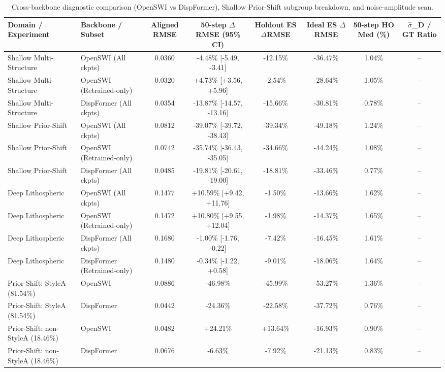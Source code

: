 \begin{table}[t]
\centering
\scriptsize
\caption{Cross-backbone diagnostic comparison (OpenSWI vs DispFormer), Shallow Prior-Shift subgroup breakdown, and noise-amplitude scan.}
\label{tab:cross_backbone_diagnostics}
\begin{tabular}{llcccccc}
\toprule
Domain / Experiment & Backbone / Subset & Aligned RMSE & 50-step $\Delta$RMSE (95\% CI) & Holdout ES $\Delta$RMSE & Ideal ES $\Delta$RMSE & 50-step HO Med (\%) & $\hat{\sigma}$\_D / GT Ratio \\
\midrule
Shallow Multi-Structure & OpenSWI (All ckpts) & 0.0360 & -4.48\% [-5.49, -3.41] & -12.15\% & -36.47\% & 1.04\% & -- \\
Shallow Multi-Structure & OpenSWI (Retrained-only) & 0.0320 & +4.73\% [+3.56, +5.96] & -2.54\% & -28.64\% & 1.05\% & -- \\
Shallow Multi-Structure & DispFormer (All ckpts) & 0.0354 & -13.87\% [-14.57, -13.16] & -15.66\% & -30.81\% & 0.78\% & -- \\
Shallow Prior-Shift & OpenSWI (All ckpts) & 0.0812 & -39.07\% [-39.72, -38.43] & -39.34\% & -49.18\% & 1.24\% & -- \\
Shallow Prior-Shift & OpenSWI (Retrained-only) & 0.0742 & -35.74\% [-36.43, -35.05] & -34.66\% & -44.24\% & 1.08\% & -- \\
Shallow Prior-Shift & DispFormer (All ckpts) & 0.0485 & -19.81\% [-20.61, -19.00] & -18.81\% & -33.46\% & 0.77\% & -- \\
Deep Lithospheric & OpenSWI (All ckpts) & 0.1477 & +10.59\% [+9.42, +11.76] & -1.50\% & -13.66\% & 1.62\% & -- \\
Deep Lithospheric & OpenSWI (Retrained-only) & 0.1472 & +10.80\% [+9.55, +12.04] & -1.98\% & -14.37\% & 1.65\% & -- \\
Deep Lithospheric & DispFormer (All ckpts) & 0.1680 & -1.00\% [-1.76, -0.22] & -7.42\% & -16.45\% & 1.61\% & -- \\
Deep Lithospheric & DispFormer (Retrained-only) & 0.1480 & -0.34\% [-1.22, +0.58] & -9.01\% & -18.06\% & 1.64\% & -- \\
Prior-Shift: StyleA (81.54\%) & OpenSWI & 0.0886 & -46.98\% & -45.99\% & -53.27\% & 1.36\% & -- \\
Prior-Shift: StyleA (81.54\%) & DispFormer & 0.0442 & -24.36\% & -22.58\% & -37.72\% & 0.76\% & -- \\
Prior-Shift: non-StyleA (18.46\%) & OpenSWI & 0.0482 & +24.21\% & +13.64\% & -16.93\% & 0.90\% & -- \\
Prior-Shift: non-StyleA (18.46\%) & DispFormer & 0.0676 & -6.63\% & -7.92\% & -21.13\% & 0.83\% & -- \\

\end{tabular}
\end{table}
